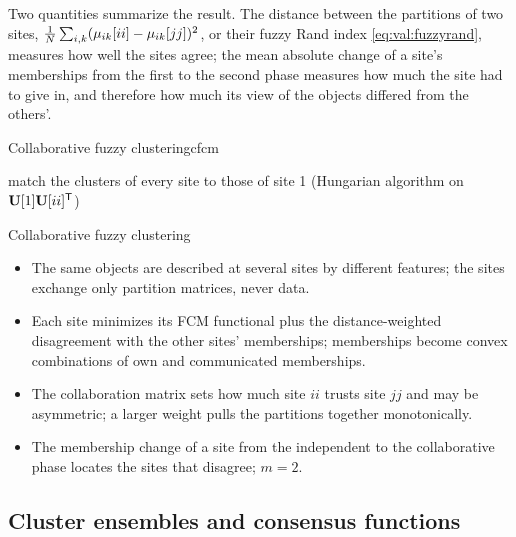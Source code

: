 Two quantities summarize the result. The distance between the partitions of two sites, $\frac1N\sum_{i,k}(\mu_{ik}[ii]-\mu_{ik}[jj])^2$, or their fuzzy Rand index \eqref{eq:val:fuzzyrand}, measures how well the sites agree; the mean absolute change of a site's memberships from the first to the second phase measures how much the site had to give in, and therefore how much its view of the objects differed from the others'.

\begin{algobox}{Collaborative fuzzy clustering}{cfcm}
\begin{algorithm}[H]
match the clusters of every site to those of site 1 (Hungarian algorithm on $\mathbf{U}[1]\mathbf{U}[ii]^{\mathsf{T}}$)\;
\end{algorithm}
\end{algobox}
\begin{summarybox}{Collaborative fuzzy clustering}
\begin{itemize}
  \item The same objects are described at several sites by different features; the sites exchange only partition matrices, never data.
  \item Each site minimizes its FCM functional plus the distance-weighted disagreement with the other sites' memberships; memberships become convex combinations of own and communicated memberships.
  \item The collaboration matrix sets how much site $ii$ trusts site $jj$ and may be asymmetric; a larger weight pulls the partitions together monotonically.
  \item The membership change of a site from the independent to the collaborative phase locates the sites that disagree; $m=2$.
\end{itemize}
\end{summarybox}

\subsection{Cluster ensembles and consensus functions}\label{sec:beyond:ensemble}

